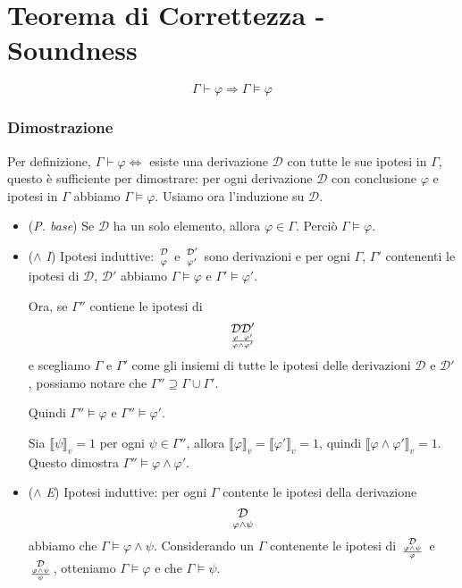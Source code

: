 \documentclass[a4paper,12pt]{report}
\newcommand\val[1]{\llbracket#1\rrbracket}
\begin{document}
\newpage
\section{Teorema di Correttezza - Soundness}

\[ \Gamma \vdash \varphi \Rightarrow \Gamma \vDash \varphi \]
\subsubsection{Dimostrazione}
Per definizione, $\Gamma \vdash \varphi \iff$ esiste una derivazione $ \mathcal{D}$ con tutte le sue ipotesi in $\Gamma$, questo \`{e} sufficiente per dimostrare: per ogni derivazione $\mathcal{D}$ con conclusione $\varphi$ e ipotesi in $\Gamma$ abbiamo $\Gamma \vDash \varphi$. Usiamo ora l'induzione su $\mathcal{D}$.
\begin{itemize}
\item (\emph{P. base}) Se $\mathcal{D}$ ha un solo elemento, allora $\varphi \in \Gamma$.  Perci\`{o} $\Gamma \vDash \varphi$.
\item (\emph{$\wedge$ I}) Ipotesi induttive: $\mathcal{D} \atop \varphi$ e $\mathcal{D}' \atop \varphi'$ sono derivazioni e per ogni $\Gamma$, $\Gamma'$ contenenti le ipotesi di $\mathcal{D}$, $\mathcal{D}'$ abbiamo $\Gamma \vDash \varphi$ e $\Gamma' \vDash \varphi'$.

Ora, se $\Gamma''$ contiene le ipotesi di
 \[ \mathcal{D} \mathcal{D}' \atop \frac{\varphi \thickspace\thickspace \varphi'}{\varphi \wedge \varphi'}\]
 e scegliamo $\Gamma$ e $\Gamma'$ come gli insiemi di tutte le ipotesi delle derivazioni $\mathcal{D}$ e $\mathcal{D}'$, possiamo 
notare che $\Gamma'' \supseteq \Gamma \cup \Gamma'$.

Quindi $\Gamma'' \vDash \varphi$ e $\Gamma'' \vDash \varphi'$. 

Sia $\val{\psi}_v = 1$ per ogni $\psi \in \Gamma''$, allora $\val{\varphi}_v = \val{\varphi'}_v = 1$, quindi $\val{\varphi \wedge \varphi'}_v = 1$. Questo dimostra $\Gamma'' \vDash \varphi \wedge \varphi'$.
\item (\emph{$\wedge$ E}) Ipotesi induttive: per ogni $\Gamma$ contente le ipotesi della derivazione 
 \[ \mathcal{D} \atop \varphi \wedge \psi\]
abbiamo che $\Gamma \vDash \varphi \wedge \psi$.  Considerando un $\Gamma$ contenente le ipotesi di $\mathcal{D}  \atop \frac{\varphi \wedge \psi}{\varphi}$ e $ \mathcal{D}  \atop \frac{\varphi \wedge \psi}{\psi}$, otteniamo $\Gamma \vDash \varphi$ e che $\Gamma \vDash \psi$. 


\end{itemize}
\end{document}
